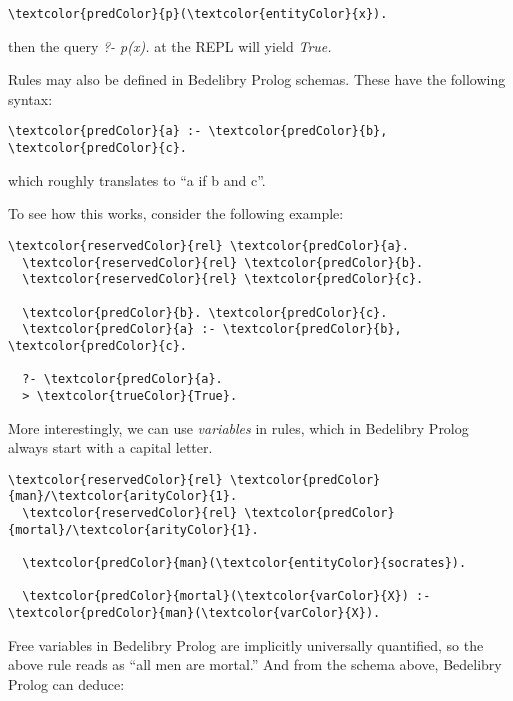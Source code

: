 \documentclass{book}
\begin{document}
\begin{Verbatim}[commandchars=\\\{\}]
  \textcolor{predColor}{p}(\textcolor{entityColor}{x}).
\end{Verbatim}

\noindent then the query \textit{?- p(x).} at the REPL will yield \textit{True.} \medskip

\noindent Rules may also be defined in Bedelibry Prolog schemas. These have the following syntax:

\begin{Verbatim}[commandchars=\\\{\}]
  \textcolor{predColor}{a} :- \textcolor{predColor}{b}, \textcolor{predColor}{c}.
\end{Verbatim}

\noindent which roughly translates to ``a if b and c''. \medskip

\noindent To see how this works, consider the following example:

\begin{Verbatim}[commandchars=\\\{\}]
  \textcolor{reservedColor}{rel} \textcolor{predColor}{a}.
  \textcolor{reservedColor}{rel} \textcolor{predColor}{b}.
  \textcolor{reservedColor}{rel} \textcolor{predColor}{c}.

  \textcolor{predColor}{b}. \textcolor{predColor}{c}.
  \textcolor{predColor}{a} :- \textcolor{predColor}{b}, \textcolor{predColor}{c}.

  ?- \textcolor{predColor}{a}.
  > \textcolor{trueColor}{True}.
\end{Verbatim}

\noindent More interestingly, we can use \textit{variables} in rules, which in Bedelibry Prolog always start with a capital letter.

\begin{Verbatim}[commandchars=\\\{\}]
  \textcolor{reservedColor}{rel} \textcolor{predColor}{man}/\textcolor{arityColor}{1}.
  \textcolor{reservedColor}{rel} \textcolor{predColor}{mortal}/\textcolor{arityColor}{1}.
  
  \textcolor{predColor}{man}(\textcolor{entityColor}{socrates}).

  \textcolor{predColor}{mortal}(\textcolor{varColor}{X}) :- \textcolor{predColor}{man}(\textcolor{varColor}{X}).
  \end{Verbatim}

\noindent Free variables in Bedelibry Prolog are implicitly universally quantified, so the above rule reads as ``all men are mortal.'' And from the schema above, Bedelibry Prolog can deduce:
\end{document}
